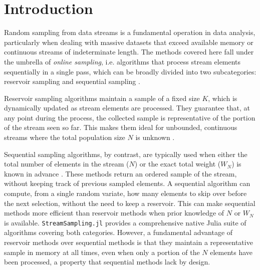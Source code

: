 \documentclass{juliacon}
\begin{document}


\maketitle

{\let \thefootnote \relax {}}

\begin{abstract}
StreamSampling.jl is a Julia library designed to provide general and efficient methods for sampling from data streams in a single pass, even when the total number of items is unknown. In this paper, we describe the capabilities of the library and its advantages over traditional sampling procedures, such as maintaining a small, constant memory footprint and avoiding the need to fully materialize the stream in memory. Furthermore, we provide empirical benchmarks comparing online sampling methods against standard approaches, demonstrating performance and memory improvements.
\end{abstract}

\section{Introduction}

Random sampling from data streams is a fundamental operation in data analysis, particularly when dealing with massive datasets that exceed available memory or continuous streams of indeterminate length. The methods covered here fall under the umbrella of \textit{online sampling}, i.e. algorithms that process stream elements sequentially in a single pass, which can be broadly divided into two subcategories: reservoir sampling and sequential sampling \cite{vitter1985random, vitter1987efficient}. 

Reservoir sampling algorithms maintain a sample of a fixed size $K$, which is dynamically updated as stream elements are processed. They guarantee that, at any point during the process, the collected sample is representative of the portion of the stream seen so far. This makes them ideal for unbounded, continuous streams where the total population size $N$ is unknown \cite{vitter1985random}. 

Sequential sampling algorithms, by contrast, are typically used when either the total number of elements in the stream ($N$) or the exact total weight ($W_N$) is known in advance \cite{vitter1987efficient, shekelyan2021sequential}. These methods return an ordered sample of the stream, without keeping track of previous sampled elements. A sequential algorithm can compute, from a single random variate, how many elements to skip over before the next selection, without the need to keep a reservoir. This can make sequential methods more efficient than reservoir methods when prior knowledge of $N$ or $W_N$ is available. \texttt{StreamSampling.jl} provides a comprehensive native Julia suite of algorithms covering both categories. However, a fundamental advantage of reservoir methods over sequential methods is that they maintain a representative sample in memory at all times, even when only a portion of the $N$ elements have been processed, a property that sequential methods lack by design.
\end{document}
